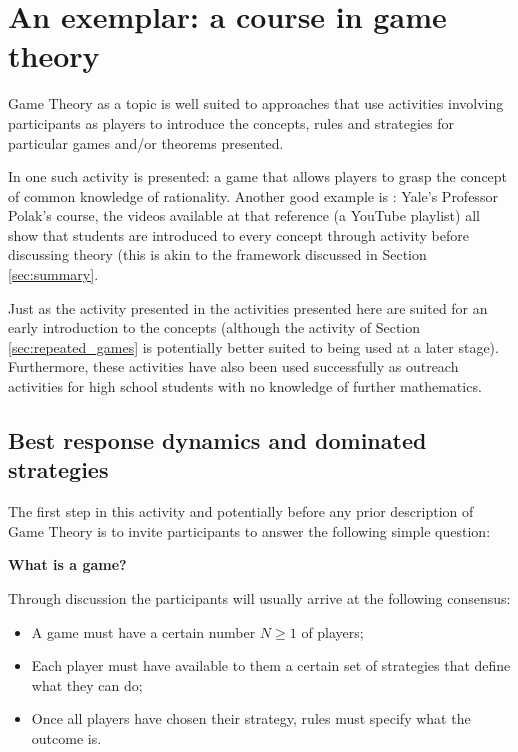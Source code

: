 \documentclass[12pt, a4paper]{article}
\begin{document}
\section{An exemplar: a course in game theory}\label{sec:game_theory}

Game Theory as a topic is well suited to approaches that use activities
involving participants as players to introduce the concepts, rules and strategies
for particular games and/or theorems presented.

In \cite{Brokaw2004} one such activity is presented: a game that allows players
to grasp the concept of common knowledge of rationality. Another good example is
\cite{Polak2008}: Yale's Professor Polak's course, the videos available at that
reference (a YouTube playlist) all show that students are introduced to every
concept through activity before discussing theory (this is akin to the framework
discussed in Section \ref{sec:summary}.

Just as the activity presented in \cite{Brokaw2004} the activities presented
here are suited for an early introduction to the concepts (although the activity
of Section \ref{sec:repeated_games} is potentially better suited to being used
at a later stage). Furthermore, these activities have also been used
successfully as outreach activities for high school students with no knowledge
of further mathematics.

\subsection{Best response dynamics and dominated strategies}\label{sec:best_responses}

The first step in this activity and potentially before any prior description of
Game Theory is to invite participants to answer the following simple question:

\begin{center}
    \textbf{What is a game?}
\end{center}

Through discussion the participants will usually arrive at the following consensus:

\begin{itemize}
    \item A game must have a certain number \(N\geq 1\) of players;
    \item Each player must have available to them a certain set of strategies
        that define what they can do;
    \item Once all players have chosen their strategy, rules must specify what
        the outcome is.
\end{itemize}
\end{document}
